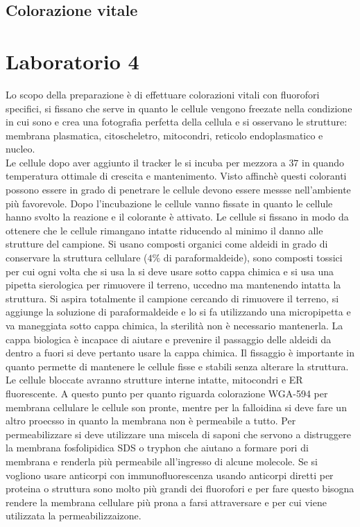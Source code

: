 	\subsection{Colorazione vitale}
		



			
\section{Laboratorio 4}
Lo scopo della preparazione \`e di effettuare colorazioni vitali con fluorofori specifici, si fissano che serve in quanto
le cellule vengono freezate nella condizione in cui sono e crea una fotografia perfetta della cellula e si osservano le strutture: membrana plasmatica, citoscheletro, mitocondri, reticolo
endoplasmatico e nucleo. \\

Le cellule dopo aver aggiunto il tracker le si incuba per mezzora a $37$ in quando temperatura ottimale di crescita e mantenimento. Visto affinch\`e 
questi coloranti possono essere in grado di penetrare le cellule devono essere messse nell'ambiente pi\`u favorevole. Dopo l'incubazione le cellule vanno fissate in quanto le cellule
hanno svolto la reazione e il colorante \`e attivato. Le cellule si fissano in modo da ottenere che le cellule rimangano intatte riducendo al minimo il danno alle strutture del campione.
Si usano composti organici come aldeidi in grado di conservare la struttura cellulare ($4\%$ di paraformaldeide), sono composti tossici per cui ogni volta che si usa la si deve usare
sotto cappa chimica e si usa una pipetta sierologica per rimuovere il terreno, uccedno ma mantenendo intatta la struttura. Si aspira totalmente il campione cercando di rimuovere il 
terreno, si aggiunge la soluzione di paraformaldeide e lo si fa utilizzando una micropipetta e va maneggiata sotto cappa chimica, la sterilit\`a non \`e necessario mantenerla. La 
cappa biologica \`e incapace di aiutare e prevenire il passaggio delle aldeidi da dentro a fuori si deve pertanto usare la cappa chimica. Il fissaggio \`e importante in quanto permette
di mantenere le cellule fisse e stabili senza alterare la struttura. Le cellule bloccate avranno strutture interne intatte, mitocondri e ER fluorescente. A questo punto per quanto 
riguarda colorazione WGA-594 per membrana cellulare le cellule son pronte, mentre per la falloidina si deve fare un altro proecsso in quanto la membrana non \`e permeabile a tutto. Per
permeabilizzare si deve utilizzare una miscela di saponi che servono a distruggere la membrana fosfolipidica SDS o tryphon che aiutano a formare pori di membrana e renderla pi\`u 
permeabile all'ingresso di alcune molecole. Se si vogliono usare anticorpi con immunofluorescenza usando anticorpi diretti per proteina o struttura sono molto pi\`u grandi dei 
fluorofori e per fare questo bisogna rendere la membrana cellulare pi\`u prona a farsi attraversare e per cui viene utilizzata la permeabilizzaizone.



